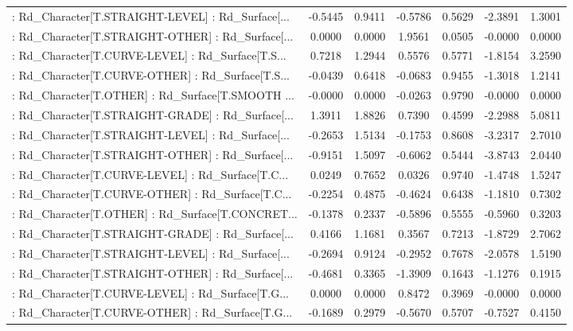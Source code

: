 \begin{longtable}{p{4cm}cccccc}
 : Rd\_Character[T.STRAIGHT-LEVEL] : Rd\_Surface[... & -0.5445 &    0.9411 & -0.5786 &       0.5629 & -2.3891 &  1.3001 \\
 : Rd\_Character[T.STRAIGHT-OTHER] : Rd\_Surface[... &  0.0000 &    0.0000 &  1.9561 &       0.0505 & -0.0000 &  0.0000 \\
 : Rd\_Character[T.CURVE-LEVEL] : Rd\_Surface[T.S... &  0.7218 &    1.2944 &  0.5576 &       0.5771 & -1.8154 &  3.2590 \\
 : Rd\_Character[T.CURVE-OTHER] : Rd\_Surface[T.S... & -0.0439 &    0.6418 & -0.0683 &       0.9455 & -1.3018 &  1.2141 \\
 : Rd\_Character[T.OTHER] : Rd\_Surface[T.SMOOTH ... & -0.0000 &    0.0000 & -0.0263 &       0.9790 & -0.0000 &  0.0000 \\
 : Rd\_Character[T.STRAIGHT-GRADE] : Rd\_Surface[... &  1.3911 &    1.8826 &  0.7390 &       0.4599 & -2.2988 &  5.0811 \\
 : Rd\_Character[T.STRAIGHT-LEVEL] : Rd\_Surface[... & -0.2653 &    1.5134 & -0.1753 &       0.8608 & -3.2317 &  2.7010 \\
 : Rd\_Character[T.STRAIGHT-OTHER] : Rd\_Surface[... & -0.9151 &    1.5097 & -0.6062 &       0.5444 & -3.8743 &  2.0440 \\
 : Rd\_Character[T.CURVE-LEVEL] : Rd\_Surface[T.C... &  0.0249 &    0.7652 &  0.0326 &       0.9740 & -1.4748 &  1.5247 \\
 : Rd\_Character[T.CURVE-OTHER] : Rd\_Surface[T.C... & -0.2254 &    0.4875 & -0.4624 &       0.6438 & -1.1810 &  0.7302 \\
 : Rd\_Character[T.OTHER] : Rd\_Surface[T.CONCRET... & -0.1378 &    0.2337 & -0.5896 &       0.5555 & -0.5960 &  0.3203 \\
 : Rd\_Character[T.STRAIGHT-GRADE] : Rd\_Surface[... &  0.4166 &    1.1681 &  0.3567 &       0.7213 & -1.8729 &  2.7062 \\
 : Rd\_Character[T.STRAIGHT-LEVEL] : Rd\_Surface[... & -0.2694 &    0.9124 & -0.2952 &       0.7678 & -2.0578 &  1.5190 \\
 : Rd\_Character[T.STRAIGHT-OTHER] : Rd\_Surface[... & -0.4681 &    0.3365 & -1.3909 &       0.1643 & -1.1276 &  0.1915 \\
 : Rd\_Character[T.CURVE-LEVEL] : Rd\_Surface[T.G... &  0.0000 &    0.0000 &  0.8472 &       0.3969 & -0.0000 &  0.0000 \\
 : Rd\_Character[T.CURVE-OTHER] : Rd\_Surface[T.G... & -0.1689 &    0.2979 & -0.5670 &       0.5707 & -0.7527 &  0.4150 \\

\end{longtable}
